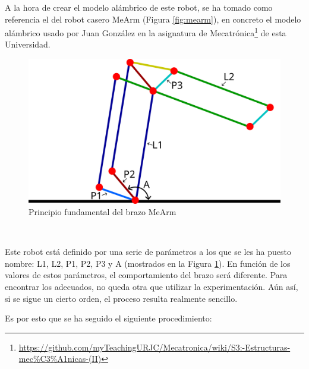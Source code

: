 A la hora de crear el modelo alámbrico de este robot, se ha tomado como referencia el del robot 
casero MeArm (Figura \ref{fig:mearm}), en concreto el modelo alámbrico usado por Juan González en la asignatura de 
Mecatrónica\footnote{\url{https://github.com/myTeachingURJC/Mecatronica/wiki/S3:-Estructuras-mec\%C3\%A1nicas-(II)}} de esta Universidad.\\
\begin{figure} [ht!]
  \begin{center}
    \includegraphics[width=15cm]{figs/mearm_params.png}
  \end{center}
  \caption{Principio fundamental del brazo MeArm}
  \label{fig:mearm_params}
\end{figure}\ 


Este robot está definido por una serie de parámetros a los que se les ha puesto nombre: L1, L2, P1, P2, P3 y A (mostrados 
en la Figura \ref{fig:mearm_params}). En función de los valores de estos parámetros, el comportamiento del brazo será diferente. Para 
encontrar los adecuados, no queda otra que utilizar la experimentación. Aún así, si se sigue un cierto orden, el proceso resulta realmente sencillo. 

\newpage
\noindent Es por esto que se ha seguido el siguiente procedimiento: 

